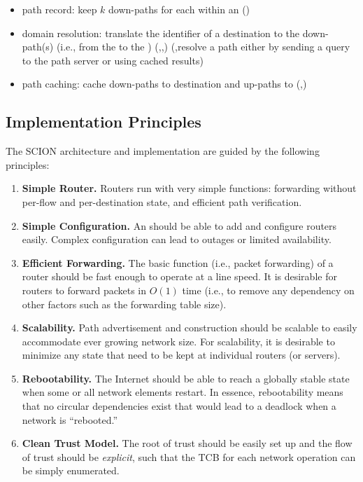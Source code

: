 \begin{itemize}
\item path record: keep $k$ down-paths for each \AD within an \ISD (\TAD)
\item domain resolution: translate the identifier of a destination \AD to the down-path(s) (i.e., from the \ISDC to the \AD) (\CAD,\TAD,\EAD) (\TAD,\EAD resolve a path either by sending a query to the \ISDC path server or using cached results) 
\item path caching: cache down-paths to destination \ADs and up-paths to \ISDC (\TAD,\EAD)
\end{itemize}


\subsection{Implementation Principles}
The SCION architecture and implementation are guided by the following principles:

\begin{enumerate}
\item {\bf Simple Router. }
Routers run with very simple functions: forwarding without per-flow and per-destination state, and efficient path verification.


\item {\bf Simple Configuration. }
An \AD should be able to add and configure routers easily. Complex configuration
can lead to outages or limited availability.


\item {\bf Efficient Forwarding. }
The basic function (i.e., packet forwarding) of a router should be fast enough to operate at a line speed. It is desirable for routers to forward packets in $O(1)$ time (i.e., to remove any dependency on other factors such as the forwarding table size). 

\item {\bf Scalability. }
Path advertisement and construction should be scalable to easily accommodate ever growing network size. For scalability, it is desirable to minimize any state that need to be kept at individual routers (or servers).

\item {\bf Rebootability. } The Internet should be able to reach a globally
  stable state when some or all network elements restart. In essence,
  rebootability means that no circular dependencies exist that would lead to a
  deadlock when a network is ``rebooted.''

\item {\bf Clean Trust Model. } The root of trust should be easily set up and
  the flow of trust should be {\em explicit}, such that the TCB for each network
  operation can be simply enumerated.

\end{enumerate}

